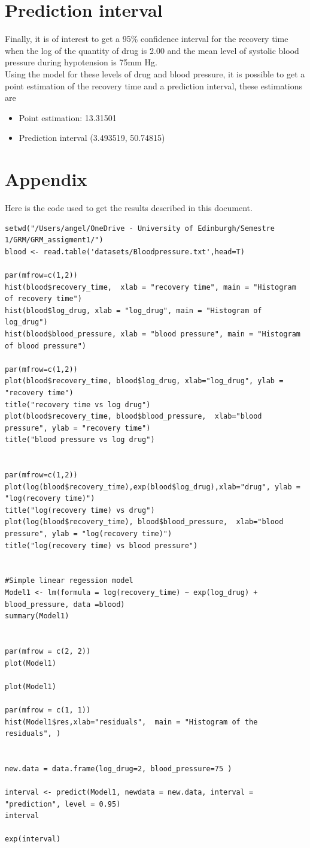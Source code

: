 \documentclass{article}
\begin{document}
\section{Prediction interval}
Finally, it is of interest to get a 95\% confidence interval for the recovery time when the  log of the quantity of drug is 2.00 and the mean level of systolic blood pressure during hypotension is 75mm Hg.
\\
Using the model for these levels of drug and blood pressure, it is possible to get a point estimation of the recovery time and a prediction interval, these estimations are

\begin{itemize}
    \item Point estimation: 13.31501
    \item Prediction interval (3.493519, 50.74815)
\end{itemize}

\newpage
\section{Appendix}

Here is the code used to get the results described in this document. 

\begin{verbatim}setwd("/Users/angel/OneDrive - University of Edinburgh/Semestre 1/GRM/GRM_assigment1/")
blood <- read.table('datasets/Bloodpressure.txt',head=T)

par(mfrow=c(1,2))
hist(blood$recovery_time,  xlab = "recovery time", main = "Histogram of recovery time")
hist(blood$log_drug, xlab = "log_drug", main = "Histogram of log_drug")
hist(blood$blood_pressure, xlab = "blood pressure", main = "Histogram of blood pressure")

par(mfrow=c(1,2))
plot(blood$recovery_time, blood$log_drug, xlab="log_drug", ylab = "recovery time")
title("recovery time vs log drug")
plot(blood$recovery_time, blood$blood_pressure,  xlab="blood pressure", ylab = "recovery time")
title("blood pressure vs log drug")


par(mfrow=c(1,2))
plot(log(blood$recovery_time),exp(blood$log_drug),xlab="drug", ylab = "log(recovery time)")
title("log(recovery time) vs drug")
plot(log(blood$recovery_time), blood$blood_pressure,  xlab="blood pressure", ylab = "log(recovery time)")
title("log(recovery time) vs blood pressure")


#Simple linear regession model 
Model1 <- lm(formula = log(recovery_time) ~ exp(log_drug) + blood_pressure, data =blood)
summary(Model1)


par(mfrow = c(2, 2))
plot(Model1)

plot(Model1)

par(mfrow = c(1, 1))
hist(Model1$res,xlab="residuals",  main = "Histogram of the residuals", )


new.data = data.frame(log_drug=2, blood_pressure=75 )

interval <- predict(Model1, newdata = new.data, interval = "prediction", level = 0.95)
interval

exp(interval)
\end{verbatim}
\end{document}
